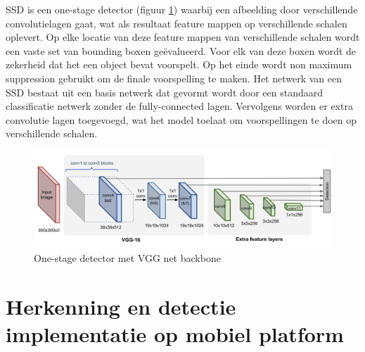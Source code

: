 SSD is een one-stage detector (figuur \ref{fig:ssd}) waarbij een afbeelding door verschillende convolutielagen gaat, wat als resultaat feature mappen op verschillende schalen oplevert.
Op elke locatie van deze feature mappen van verschillende schalen wordt een vaste set van bounding boxen ge\"evalueerd.
Voor elk van deze boxen wordt de zekerheid dat het een object bevat voorspelt.
Op het einde wordt non maximum suppression gebruikt om de finale voorspelling te maken.
Het netwerk van een SSD bestaat uit een basis netwerk dat gevormt wordt door een standaard classificatie netwerk zonder de fully-connected lagen.
Vervolgens worden er extra convolutie lagen toegevoegd, wat het model toelaat om voorspellingen te doen op verschillende schalen.

\begin{figure}[!ht]
	\centering
	\includegraphics[width=0.80\linewidth]{fig/SSD.png}
	\caption{One-stage detector met VGG net backbone}
	\label{fig:ssd}
\end{figure}

\chapter{Herkenning en detectie implementatie op mobiel platform}
